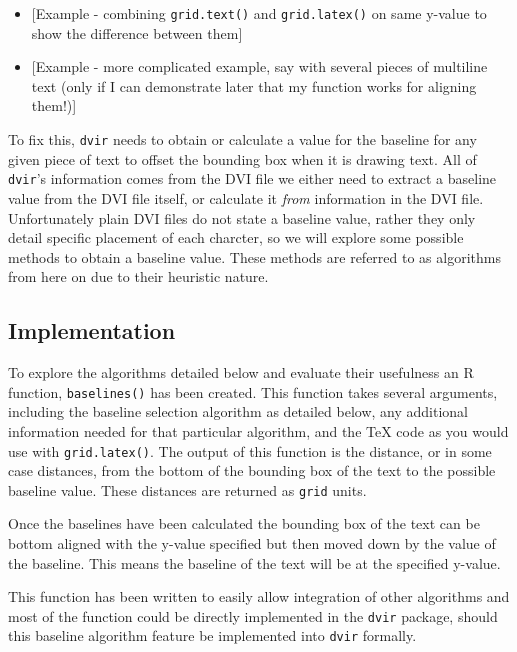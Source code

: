 \documentclass[]{article}
\begin{document}
\begin{itemize}
\item
  {[}Example - combining \texttt{grid.text()} and \texttt{grid.latex()}
  on same y-value to show the difference between them{]}
\item
  {[}Example - more complicated example, say with several pieces of
  multiline text (only if I can demonstrate later that my function works
  for aligning them!){]}
\end{itemize}

To fix this, \texttt{dvir} needs to obtain or calculate a value for the
baseline for any given piece of text to offset the bounding box when it
is drawing text. All of \texttt{dvir}'s information comes from the DVI
file we either need to extract a baseline value from the DVI file
itself, or calculate it \emph{from} information in the DVI file.
Unfortunately plain DVI files do not state a baseline value, rather they
only detail specific placement of each charcter, so we will explore some
possible methods to obtain a baseline value. These methods are referred
to as algorithms from here on due to their heuristic nature.

\subsection{Implementation}\label{implementation}

To explore the algorithms detailed below and evaluate their usefulness
an R function, \texttt{baselines()} has been created. This function
takes several arguments, including the baseline selection algorithm as
detailed below, any additional information needed for that particular
algorithm, and the \TeX{} code as you would use with
\texttt{grid.latex()}. The output of this function is the distance, or
in some case distances, from the bottom of the bounding box of the text
to the possible baseline value. These distances are returned as
\texttt{grid} units.

Once the baselines have been calculated the bounding box of the text can
be bottom aligned with the y-value specified but then moved down by the
value of the baseline. This means the baseline of the text will be at
the specified y-value.

This function has been written to easily allow integration of other
algorithms and most of the function could be directly implemented in the
\texttt{dvir} package, should this baseline algorithm feature be
implemented into \texttt{dvir} formally.
\end{document}
